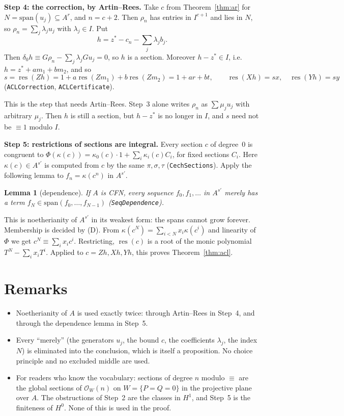 \documentclass[11pt]{amsart}
\newtheorem{lemma}[theorem]{Lemma}
\theoremstyle{definition}
\theoremstyle{remark}
\DeclareMathOperator{\res}{res}
\newcommand{\sm}{\mathrm{span}}
\begin{document}
\textbf{Step 4: the correction, by Artin--Rees.} Take $c$ from
Theorem~\ref{thm:ar} for $N=\sm(u_j)\subseteq A^r$, and $n=c+2$. Then
$\rho_n$ has entries in $I^{c+1}$ and lies in $N$, so
$\rho_n=\sum_j\lambda_ju_j$ with $\lambda_j\in I$. Put
\[
 h=z^*-c_n-\sum_j\lambda_jb_j .
\]
Then $\delta_0h\equiv G\rho_n-\sum_j\lambda_jGu_j=0$, so $h$ is a section.
Moreover $h-z^*\in I$, i.e.\ $h=z^*+am_1+bm_2$, and so
\[
 s=\res(Zh)=1+a\res(Zm_1)+b\res(Zm_2)=1+ar+bt,\qquad
 \res(Xh)=sx,\quad\res(Yh)=sy
\]
(\texttt{ACLCorrection}, \texttt{ACLCertificate}).

This is the step that needs Artin--Rees. Step~3 alone writes $\rho_n$ as
$\sum\mu_ju_j$ with arbitrary $\mu_j$. Then $h$ is still a section, but
$h-z^*$ is no longer in $I$, and $s$ need not be $\equiv1$ modulo $I$.

\textbf{Step 5: restrictions of sections are integral.} Every section $c$
of degree~$0$ is congruent to $\Phi(\kappa(c))=\kappa_0(c)\cdot1+\sum_i
\kappa_i(c)C_i$, for fixed sections $C_i$. Here
$\kappa(c)\in A^{s'}$ is computed from $c$ by the same $\pi,\sigma,\tau$
(\texttt{CechSections}). Apply the following lemma to
$f_n=\kappa(c^n)$ in $A^{s'}$.

\begin{lemma}[dependence]
If $A$ is CFN, every sequence $f_0,f_1,\dots$ in $A^{s'}$ merely has a
term $f_N\in\sm(f_0,\dots,f_{N-1})$ (\texttt{SeqDependence}).
\end{lemma}

This is noetherianity of $A^{s'}$ in its weakest form: the spans cannot
grow forever. Membership is decided by (D). From
$\kappa(c^N)=\sum_{i<N}x_i\kappa(c^i)$ and linearity of $\Phi$ we get
$c^N\equiv\sum_ix_ic^i$. Restricting, $\res(c)$ is a root of the monic
polynomial $T^N-\sum_ix_iT^i$. Applied to $c=Zh,Xh,Yh$, this proves
Theorem~\ref{thm:acl}.

\section{Remarks}

\begin{itemize}
\item Noetherianity of $A$ is used exactly twice: through Artin--Rees in
  Step~4, and through the dependence lemma in Step~5.
\item Every ``merely'' (the generators $u_j$, the bound $c$, the
  coefficients $\lambda_j$, the index $N$) is eliminated into the
  conclusion, which is itself a proposition. No choice principle and no
  excluded middle are used.
\item For readers who know the vocabulary: sections of degree $n$ modulo
  $\equiv$ are the global sections of $\mathcal O_W(n)$ on
  $W=\{P=Q=0\}$ in the projective plane over $A$. The obstructions of
  Step~2 are the classes in $H^1$, and Step~5 is the finiteness of
  $H^0$. None of this is used in the proof.
\end{itemize}
\end{document}
